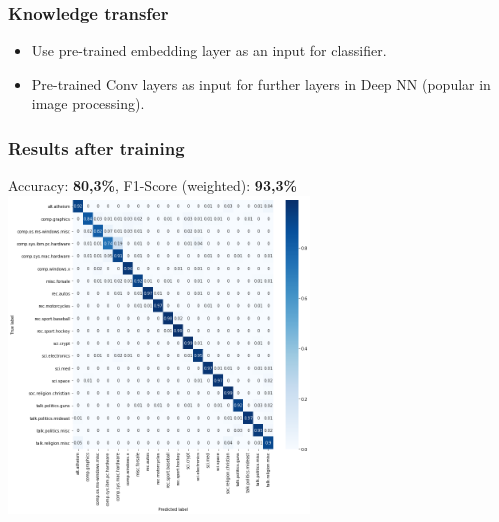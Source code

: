 \documentclass{beamer}
\begin{document}
    \begin{frame}
    	\frametitle{Knowledge transfer}
        \begin{itemize}
            \item Use pre-trained embedding layer as an input for classifier.
            \item Pre-trained Conv layers as input for further layers in Deep NN (popular in image processing).
        \end{itemize}
    \end{frame}
    \begin{frame}
    	\frametitle{Results after training}
        \centering
        Accuracy: \textbf{80,3\%}, F1-Score (weighted): \textbf{93,3\%}
        \includegraphics[width=0.6\textwidth]{rnn_matrix.png}
    \end{frame}
    
\end{document}
